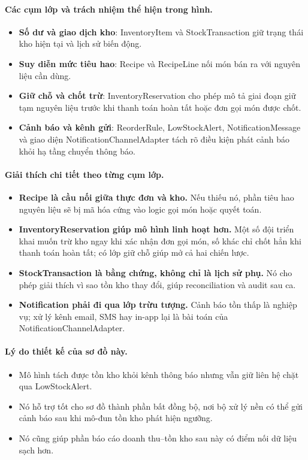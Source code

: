 \documentclass[11pt,a4paper]{article}
\begin{document}
\paragraph{Các cụm lớp và trách nhiệm thể hiện trong hình.}
\begin{itemize}
  \item \textbf{Số dư và giao dịch kho}: \textsf{InventoryItem} và \textsf{StockTransaction} giữ trạng thái kho hiện tại và lịch sử biến động.
  \item \textbf{Suy diễn mức tiêu hao}: \textsf{Recipe} và \textsf{RecipeLine} nối món bán ra với nguyên liệu cần dùng.
  \item \textbf{Giữ chỗ và chốt trừ}: \textsf{InventoryReservation} cho phép mô tả giai đoạn giữ tạm nguyên liệu trước khi thanh toán hoàn tất hoặc đơn gọi món được chốt.
  \item \textbf{Cảnh báo và kênh gửi}: \textsf{ReorderRule}, \textsf{LowStockAlert}, \textsf{NotificationMessage} và giao diện \textsf{NotificationChannelAdapter} tách rõ điều kiện phát cảnh báo khỏi hạ tầng chuyển thông báo.
\end{itemize}

\paragraph{Giải thích chi tiết theo từng cụm lớp.}
\begin{itemize}
  \item \textbf{Recipe là cầu nối giữa thực đơn và kho.} Nếu thiếu nó, phần tiêu hao nguyên liệu sẽ bị mã hóa cứng vào logic gọi món hoặc quyết toán.
  \item \textbf{InventoryReservation giúp mô hình linh hoạt hơn.} Một số đội triển khai muốn trừ kho ngay khi xác nhận đơn gọi món, số khác chỉ chốt hẳn khi thanh toán hoàn tất; có lớp giữ chỗ giúp mở cả hai chiến lược.
  \item \textbf{StockTransaction là bằng chứng, không chỉ là lịch sử phụ.} Nó cho phép giải thích vì sao tồn kho thay đổi, giúp reconciliation và audit sau ca.
  \item \textbf{Notification phải đi qua lớp trừu tượng.} Cảnh báo tồn thấp là nghiệp vụ; xử lý kênh email, SMS hay in-app lại là bài toán của \textsf{NotificationChannelAdapter}.
\end{itemize}

\paragraph{Lý do thiết kế của sơ đồ này.}
\begin{itemize}
  \item Mô hình tách được tồn kho khỏi kênh thông báo nhưng vẫn giữ liên hệ chặt qua \textsf{LowStockAlert}.
  \item Nó hỗ trợ tốt cho sơ đồ thành phần bất đồng bộ, nơi bộ xử lý nền có thể gửi cảnh báo sau khi mô-đun tồn kho phát hiện ngưỡng.
  \item Nó cũng giúp phần báo cáo doanh thu--tồn kho sau này có điểm nối dữ liệu sạch hơn.
\end{itemize}
\end{document}
